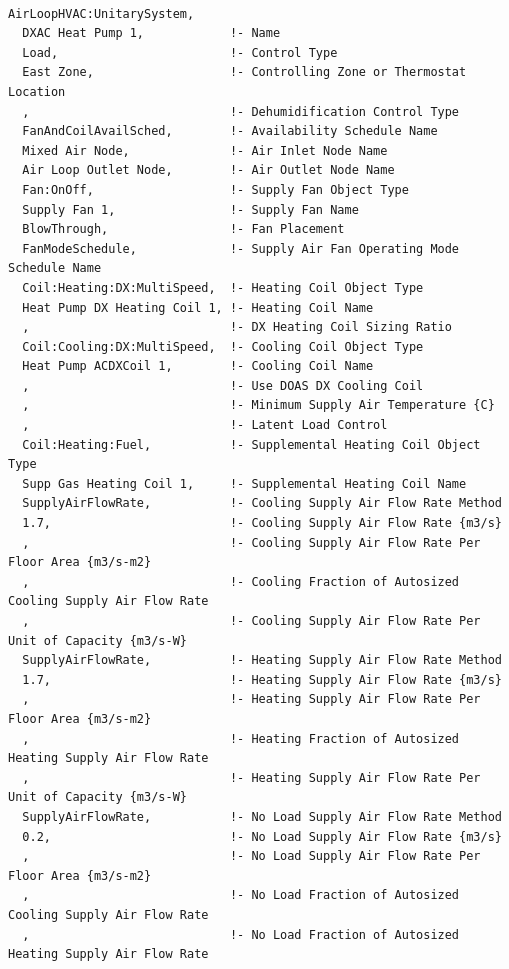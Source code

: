 \begin{lstlisting}

AirLoopHVAC:UnitarySystem,
  DXAC Heat Pump 1,            !- Name
  Load,                        !- Control Type
  East Zone,                   !- Controlling Zone or Thermostat Location
  ,                            !- Dehumidification Control Type
  FanAndCoilAvailSched,        !- Availability Schedule Name
  Mixed Air Node,              !- Air Inlet Node Name
  Air Loop Outlet Node,        !- Air Outlet Node Name
  Fan:OnOff,                   !- Supply Fan Object Type
  Supply Fan 1,                !- Supply Fan Name
  BlowThrough,                 !- Fan Placement
  FanModeSchedule,             !- Supply Air Fan Operating Mode Schedule Name
  Coil:Heating:DX:MultiSpeed,  !- Heating Coil Object Type
  Heat Pump DX Heating Coil 1, !- Heating Coil Name
  ,                            !- DX Heating Coil Sizing Ratio
  Coil:Cooling:DX:MultiSpeed,  !- Cooling Coil Object Type
  Heat Pump ACDXCoil 1,        !- Cooling Coil Name
  ,                            !- Use DOAS DX Cooling Coil
  ,                            !- Minimum Supply Air Temperature {C}
  ,                            !- Latent Load Control
  Coil:Heating:Fuel,           !- Supplemental Heating Coil Object Type
  Supp Gas Heating Coil 1,     !- Supplemental Heating Coil Name
  SupplyAirFlowRate,           !- Cooling Supply Air Flow Rate Method
  1.7,                         !- Cooling Supply Air Flow Rate {m3/s}
  ,                            !- Cooling Supply Air Flow Rate Per Floor Area {m3/s-m2}
  ,                            !- Cooling Fraction of Autosized Cooling Supply Air Flow Rate
  ,                            !- Cooling Supply Air Flow Rate Per Unit of Capacity {m3/s-W}
  SupplyAirFlowRate,           !- Heating Supply Air Flow Rate Method
  1.7,                         !- Heating Supply Air Flow Rate {m3/s}
  ,                            !- Heating Supply Air Flow Rate Per Floor Area {m3/s-m2}
  ,                            !- Heating Fraction of Autosized Heating Supply Air Flow Rate
  ,                            !- Heating Supply Air Flow Rate Per Unit of Capacity {m3/s-W}
  SupplyAirFlowRate,           !- No Load Supply Air Flow Rate Method
  0.2,                         !- No Load Supply Air Flow Rate {m3/s}
  ,                            !- No Load Supply Air Flow Rate Per Floor Area {m3/s-m2}
  ,                            !- No Load Fraction of Autosized Cooling Supply Air Flow Rate
  ,                            !- No Load Fraction of Autosized Heating Supply Air Flow Rate

\end{lstlisting}

